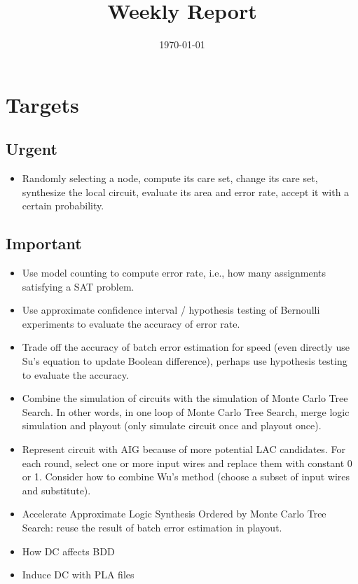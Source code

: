 \documentclass{rpt}
\title{Weekly Report}
\author{}
\date{\today}
\begin{document}
\maketitle

\section{Targets}

\subsection{Urgent}
\begin{itemize}
    \item Randomly selecting a node,
        compute its care set,
        change its care set,
        synthesize the local circuit,
        evaluate its area and error rate,
        accept it with a certain probability.
\end{itemize}

\subsection{Important}
\begin{itemize}
    \item Use model counting to compute error rate, i.e., how many assignments satisfying a SAT problem.
    \item Use approximate confidence interval / hypothesis testing of Bernoulli experiments to evaluate the accuracy of error rate.
    \item Trade off the accuracy of batch error estimation for speed
        (even directly use Su's equation to update Boolean difference),
        perhaps use hypothesis testing to evaluate the accuracy.
    \item Combine the simulation of circuits with the simulation of Monte Carlo Tree Search.
        In other words,
        in one loop of Monte Carlo Tree Search,
        merge logic simulation and playout (only simulate circuit once and playout once).
    \item Represent circuit with AIG because of more potential LAC candidates.
        For each round, select one or more input wires and replace them with constant 0 or 1.
        Consider how to combine Wu's method (choose a subset of input wires and substitute).
    \item Accelerate Approximate Logic Synthesis Ordered by Monte Carlo Tree Search:
        reuse the result of batch error estimation in playout.
    \item How DC affects BDD
    \item Induce DC with PLA files
\end{itemize}
\end{document}
